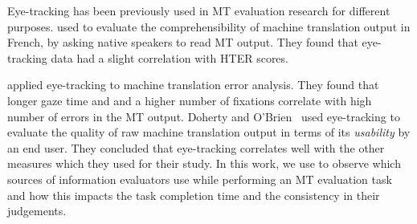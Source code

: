 Eye-tracking has been previously used in MT evaluation research for different purposes. 
%
%
%
%
 used \eye to
%
evaluate the comprehensibility of machine translation output in French, by asking native speakers to read MT output. 
%
%
%
They found that eye-tracking data 
had a slight correlation with HTER scores. 

 applied eye-tracking to machine translation error analysis. 
%
%
%
%
They found that longer gaze time and and a higher number of fixations correlate with high number of errors in the MT output. 
%
Doherty and O'Brien~ used eye-tracking to evaluate the quality of raw machine translation output in terms of its \emph{usability} by an end user. 
%
%
%
%
They concluded that eye-tracking correlates well with the other measures which they used for their study. 
In this work, we use \eye to observe which sources of information evaluators use while performing an MT evaluation task and how this impacts the task completion time and the consistency in their judgements.
 



